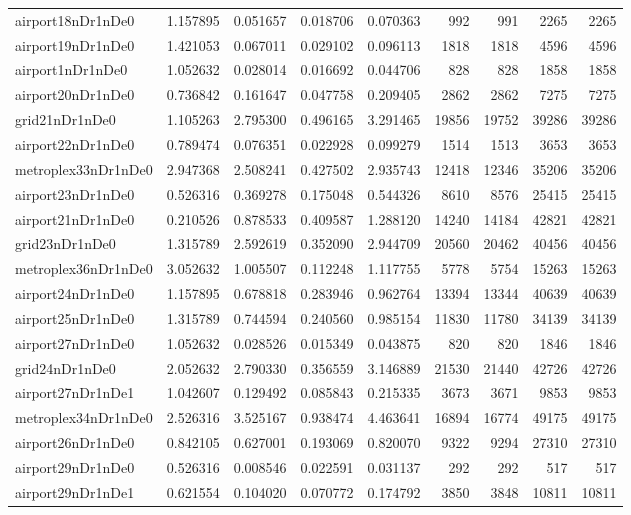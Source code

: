 \begin{longtable}{|l|r|r|r|r|r|r|r|r|}
airport18nDr1nDe0 & 1.157895 & 0.051657 & 0.018706 & 0.070363 & 992 & 991 & 2265 & 2265 \\
airport19nDr1nDe0 & 1.421053 & 0.067011 & 0.029102 & 0.096113 & 1818 & 1818 & 4596 & 4596 \\
airport1nDr1nDe0 & 1.052632 & 0.028014 & 0.016692 & 0.044706 & 828 & 828 & 1858 & 1858 \\
airport20nDr1nDe0 & 0.736842 & 0.161647 & 0.047758 & 0.209405 & 2862 & 2862 & 7275 & 7275 \\
grid21nDr1nDe0 & 1.105263 & 2.795300 & 0.496165 & 3.291465 & 19856 & 19752 & 39286 & 39286 \\
airport22nDr1nDe0 & 0.789474 & 0.076351 & 0.022928 & 0.099279 & 1514 & 1513 & 3653 & 3653 \\
metroplex33nDr1nDe0 & 2.947368 & 2.508241 & 0.427502 & 2.935743 & 12418 & 12346 & 35206 & 35206 \\
airport23nDr1nDe0 & 0.526316 & 0.369278 & 0.175048 & 0.544326 & 8610 & 8576 & 25415 & 25415 \\
airport21nDr1nDe0 & 0.210526 & 0.878533 & 0.409587 & 1.288120 & 14240 & 14184 & 42821 & 42821 \\
grid23nDr1nDe0 & 1.315789 & 2.592619 & 0.352090 & 2.944709 & 20560 & 20462 & 40456 & 40456 \\
metroplex36nDr1nDe0 & 3.052632 & 1.005507 & 0.112248 & 1.117755 & 5778 & 5754 & 15263 & 15263 \\
airport24nDr1nDe0 & 1.157895 & 0.678818 & 0.283946 & 0.962764 & 13394 & 13344 & 40639 & 40639 \\
airport25nDr1nDe0 & 1.315789 & 0.744594 & 0.240560 & 0.985154 & 11830 & 11780 & 34139 & 34139 \\
airport27nDr1nDe0 & 1.052632 & 0.028526 & 0.015349 & 0.043875 & 820 & 820 & 1846 & 1846 \\
grid24nDr1nDe0 & 2.052632 & 2.790330 & 0.356559 & 3.146889 & 21530 & 21440 & 42726 & 42726 \\
airport27nDr1nDe1 & 1.042607 & 0.129492 & 0.085843 & 0.215335 & 3673 & 3671 & 9853 & 9853 \\
metroplex34nDr1nDe0 & 2.526316 & 3.525167 & 0.938474 & 4.463641 & 16894 & 16774 & 49175 & 49175 \\
airport26nDr1nDe0 & 0.842105 & 0.627001 & 0.193069 & 0.820070 & 9322 & 9294 & 27310 & 27310 \\
airport29nDr1nDe0 & 0.526316 & 0.008546 & 0.022591 & 0.031137 & 292 & 292 & 517 & 517 \\
airport29nDr1nDe1 & 0.621554 & 0.104020 & 0.070772 & 0.174792 & 3850 & 3848 & 10811 & 10811 \\

\end{longtable}
